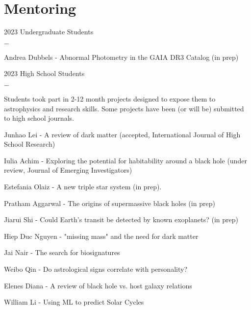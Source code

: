 \documentclass[]{scoggins-cv} %
\begin{document}
\vspace{0.3cm}

  \section{Mentoring}
      \begin{entrylist}

	    \entry
	    {2023}
	      {Undergraduate Students} 
	      {}
	    {%
		\vspace{-1em}
		\begin{list}{{\color{numcolor}$-$}}{\cvlist}
		\item Andrea Dubbels - Abnormal Photometry in the GAIA DR3 Catalog (in prep)

		\end{list}
	    }
	    \entry
	    {2023}
	      {High School Students} 
	      {}
	    {%
		\vspace{-1em}
		\begin{list}{{\color{numcolor}$-$}}{\cvlist}
		\item Students took part in 2-12 month projects designed to expose them to astrophysics and research skills. Some projects have been (or will be) submitted to high school journals.
		    \item Junhao Lei - A review of dark matter (accepted, International Journal of High School Research)
		    \item Iulia Achim - Exploring the potential for habitability around a black hole (under review, Journal of Emerging Investigators)
		    \item Estefania Olaiz - A new triple star system (in prep).
		    \item Pratham Aggarwal - The origins of supermassive black holes (in prep)
		    \item Jiarui Shi - Could Earth's transit be detected by known exoplanets? (in prep)
		    \item Hiep Duc Nguyen - "missing mass" and the need for dark matter
		    \item Jai Nair - The search for biosignatures
		    \item Weibo Qin - Do astrological signs correlate with personality? 
		    \item Elenes Diana - A review of black hole vs. host galaxy relations
		    \item William Li - Using ML to predict Solar Cycles

		\end{list}
	    }


      \end{entrylist}
\end{document}
